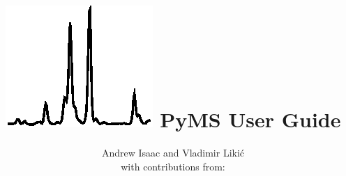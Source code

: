\documentclass[twoside,a4paper]{book}
\begin{document}
\frontmatter

\title{\includegraphics{logo/PyMS.eps}
\Large{PyMS User Guide}}
\author{Andrew Isaac and Vladimir Liki\'{c}\\
with contributions from:\\
\medskip}

\medskip



\maketitle
\tableofcontents

\mainmatter





















\backmatter
\printindex
\end{document}
